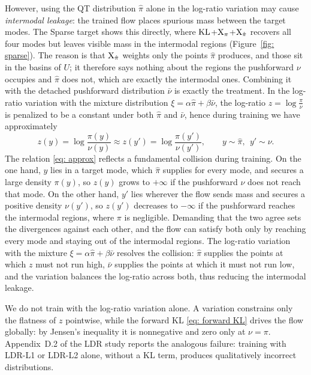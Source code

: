 \documentclass{article}
\begin{document}
However, using the QT distribution $\hat\pi$ alone in the log-ratio variation may cause \emph{intermodal leakage}: the trained flow places spurious mass between the target modes. The Sparse target shows this directly, where $\mathrm{KL}$+$\mathrm{X}_\pi$+$\mathrm{X}_{\hat\pi}$ recovers all four modes but leaves visible mass in the intermodal regions (Figure~\ref{fig: sparse}). The reason is that $\mathrm{X}_{\hat\pi}$ weights only the points $\hat\pi$ produces, and those sit in the basins of $U$; it therefore says nothing about the regions the pushforward $\nu$ occupies and $\hat\pi$ does not, which are exactly the intermodal ones. Combining it with the detached pushforward distribution $\bar\nu$ is exactly the treatment. In the log-ratio variation with the mixture distribution $\xi =\alpha\hat\pi+\beta\bar\nu$, the log-ratio $z=\log\frac{\pi}{\nu}$ is penalized to be a constant under both $\hat\pi$ and $\bar\nu$, hence during training we have approximately
\begin{equation}
	z(y) = \log\frac{\pi(y)}{\nu(y)} \approx z(y') = \log\frac{\pi(y')}{\nu(y')}, \qquad
	y\sim \hat\pi,~~y'\sim\nu.
	\label{eq: approx} 
\end{equation}
The relation \eqref{eq: approx} reflects a fundamental collision during training. On the one hand, $y$ lies in a target mode, which $\hat\pi$ supplies for every mode, and secures a large density $\pi(y)$, so $z(y)$ grows to $+\infty$ if the pushforward $\nu$ does not reach that mode. On the other hand, $y'$ lies wherever the flow sends mass and secures a positive density $\nu(y')$, so $z(y')$ decreases to $-\infty$ if the pushforward reaches the intermodal regions, where $\pi$ is negligible. Demanding that the two agree sets the divergences against each other, and the flow can satisfy both only by reaching every mode and staying out of the intermodal regions. The log-ratio variation with the mixture $\xi = \alpha\hat\pi+\beta\bar\nu$ resolves the collision: $\hat\pi$ supplies the points at which $z$ must not run high, $\bar\nu$ supplies the points at which it must not run low, and the variation balances the log-ratio across both, thus reducing the intermodal leakage.


\begin{remark}
	We do not train with the log-ratio variation alone. A variation constrains only the flatness of $z$ pointwise, while the forward KL \eqref{eq: forward KL} drives the flow globally: by Jensen's inequality it is nonnegative and zero only at $\nu=\pi$. Appendix~D.2 of the LDR study \citep{schopmans2026ldr} reports the analogous failure: training with LDR-L1 or LDR-L2 alone, without a KL term, produces qualitatively incorrect distributions.
\end{remark}
\end{document}
